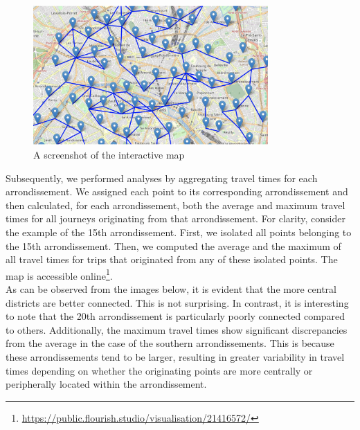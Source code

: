 \documentclass[a4paper,12pt]{article}
\begin{document}
\begin{figure}[h!]
	\centering
	\includegraphics[width=0.8\textwidth]{images/interactive_map.png}
	\caption{A screenshot of the interactive map}
	\label{fig:interactive_maps}
\end{figure}

Subsequently, we performed analyses by aggregating travel times for each arrondissement. We assigned each point to its corresponding arrondissement and then calculated, for each arrondissement, both the average and maximum travel times for all journeys originating from that arrondissement. For clarity, consider the example of the 15th arrondissement. First, we isolated all points belonging to the 15th arrondissement. Then, we computed the average and the maximum of all travel times for trips that originated from any of these isolated points. The map is accessible online\footnote{\url{https://public.flourish.studio/visualisation/21416572/}}. \\

As can be observed from the images below, it is evident that the more central districts are better connected. This is not surprising. In contrast, it is interesting to note that the 20th arrondissement is particularly poorly connected compared to others. Additionally, the maximum travel times show significant discrepancies from the average in the case of the southern arrondissements. This is because these arrondissements tend to be larger, resulting in greater variability in travel times depending on whether the originating points are more centrally or peripherally located within the arrondissement.
\end{document}
